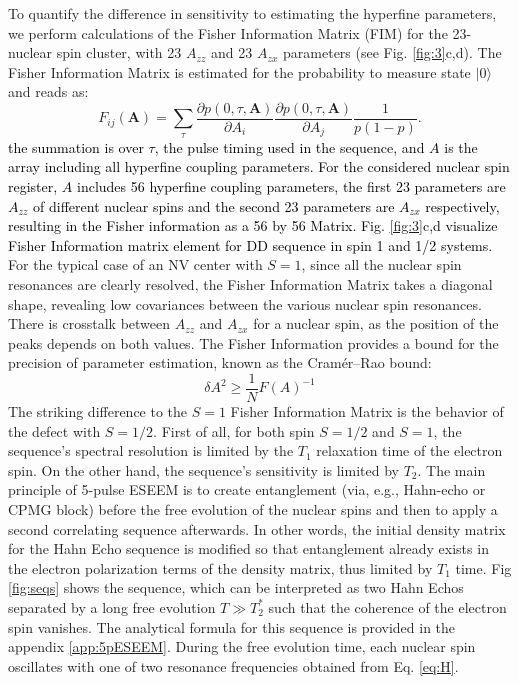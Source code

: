 \documentclass[%
 reprint,
superscriptaddress,
 amsmath,amssymb,
 aps,
]{revtex4-2}
\begin{document}
To quantify the difference in sensitivity to estimating the hyperfine parameters, we perform calculations of the Fisher Information Matrix (FIM) for the 23-nuclear spin cluster, with 23 $A_{zz}$ and 23 $A_{zx}$ parameters (see Fig. \ref{fig:3}c,d).
The Fisher Information Matrix is estimated for the probability to measure state $|0\rangle$ and reads as: 
\begin{equation}
	F_{ij}(\textbf{A})=\sum_\tau \frac{\partial p(0, \tau, \textbf{A})}{\partial A_i}\frac{\partial p(0, \tau, \textbf{A})}{ \partial A_j} \frac{1}{p (1-p)}.
\end{equation}
\textcolor{black}{the summation is over $\tau$, the pulse timing used in the sequence, and $A$ is the array including all hyperfine coupling parameters. For the considered nuclear spin register, $A$ includes 56 hyperfine coupling parameters, the first 23 parameters are $A_{zz}$ of different nuclear spins and the second 23 parameters are $A_{zx}$ respectively, resulting in the Fisher information as a 56 by 56 Matrix. Fig. \ref{fig:3}c,d visualize Fisher Information matrix element for DD sequence in spin 1 and 1/2 systems.}
For the typical case of an NV center with $S=1$, since all the nuclear spin resonances are clearly resolved, the Fisher Information Matrix takes a diagonal shape, revealing low covariances between the various nuclear spin resonances.
There is crosstalk between $A_{zz}$ and $A_{zx}$ for a nuclear spin, as the position of the peaks depends on both values.
The Fisher Information provides a bound for the precision of parameter estimation, known as the Cramér–Rao bound: 
\begin{equation}
	\delta A^2 \ge \frac{1}{N} F(A)^{-1}
\end{equation}
The striking difference to the $S=1$ Fisher Information Matrix is the behavior of the defect with $S=1/2$.
First of all, for both spin $S=1/2$ and $S=1$, the sequence's spectral resolution is limited by the $T_1$ relaxation time of the electron spin.
On the other hand, the sequence's sensitivity is limited by $T_2$.
The main principle of 5-pulse ESEEM \cite{kasumaj20085} is to create entanglement (via, e.g., Hahn-echo or CPMG block) before the free evolution of the nuclear spins and then to apply a second correlating sequence afterwards.
In other words, the initial density matrix for the Hahn Echo sequence is modified so that entanglement already exists in the electron polarization terms of the density matrix, thus limited by $T_1$ time.
Fig \ref{fig:seqs} shows the sequence, which can be interpreted as two Hahn Echos separated by a long free evolution $T\gg T_2^\ast$ such that the coherence of the electron spin vanishes. The analytical formula for this sequence is provided in the appendix \ref{app:5pESEEM}.
During the free evolution time, each nuclear spin oscillates with one of two resonance frequencies obtained from Eq. \ref{eq:H}.
\end{document}

